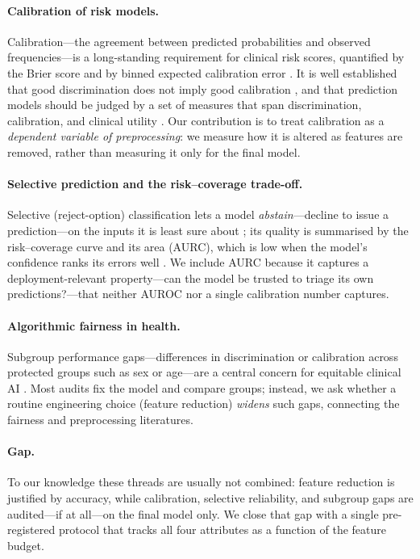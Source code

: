 \documentclass[fleqn,10pt]{wlscirep}
\begin{document}
\paragraph{Calibration of risk models.}
Calibration---the agreement between predicted probabilities and observed frequencies---is a
long-standing requirement for clinical risk scores, quantified by the Brier score \cite{brier1950verification}
and by binned expected calibration error \cite{niculescu2005predicting,guo2017calibration}.
It is well established that good discrimination does not imply good
calibration \cite{vancalster2019calibration}, and that prediction models should be judged by a
set of measures that span discrimination, calibration, and clinical utility
\cite{steyerberg2010assessing}. Our contribution is to treat calibration as a
\emph{dependent variable of preprocessing}: we measure how it is altered as features are removed,
rather than measuring it only for the final model.

\paragraph{Selective prediction and the risk--coverage trade-off.}
Selective (reject-option) classification lets a model \emph{abstain}---decline to issue a
prediction---on the inputs it is least sure about \cite{elyaniv2010foundations}; its quality is
summarised by the risk--coverage curve and
its area (AURC), which is low when the model's confidence ranks its errors well
\cite{geifman2017selective}. We include AURC because it captures a
deployment-relevant property---can the model be trusted to triage its own predictions?---that
neither AUROC nor a single calibration number captures.

\paragraph{Algorithmic fairness in health.}
Subgroup performance gaps---differences in discrimination or calibration across protected
groups such as sex or age---are a central concern for equitable clinical AI
\cite{obermeyer2019dissecting,rajkomar2018ensuring}. Most audits fix the model and compare
groups; instead, we ask whether a routine engineering choice
(feature reduction) \emph{widens} such gaps, connecting the fairness and preprocessing
literatures.

\paragraph{Gap.} To our knowledge these threads are usually not combined: feature reduction
is justified by accuracy, while calibration, selective reliability, and subgroup gaps are
audited---if at all---on the final model only. We close that gap with a single pre-registered
protocol that tracks all four attributes as a function of the feature budget.
\end{document}
